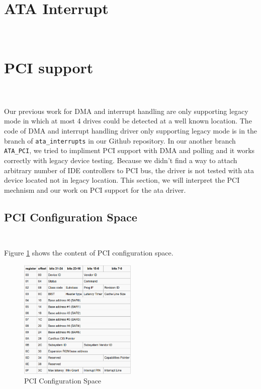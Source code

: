 \documentclass[11pt]{article}
\begin{document}
\section{ATA Interrupt\\\\}


\section{PCI support\\\\}

Our previous work for DMA and interrupt handling are only supporting legacy mode in which at most 4 drives could be detected at a well known location. The code of DMA and interrupt handling driver only supporting legacy mode is in the branch of \texttt{ata\_interrupts} in our Github repository. In our another branch \texttt{ATA\_PCI}, we tried to impliment PCI support with DMA and polling and it works correctly with legacy device testing. Because we didn't find a way to attach arbitrary number of IDE controllers to PCI bus, the driver is not tested with ata device located not in legacy location. This section, we will interpret the PCI mechnism and our work on PCI support for the ata driver.

\subsection{PCI Configuration Space\\\\}

Figure \ref{fig:cfg} shows the content of PCI configuration space.

\begin{figure}[h!]
  \center
  \includegraphics[width=0.5\textwidth]{./Figure/cfg.png}
  \caption{PCI Configuration Space\cite{OSDev_PCI}}
  \label{fig:cfg}
\end{figure}
\end{document}
